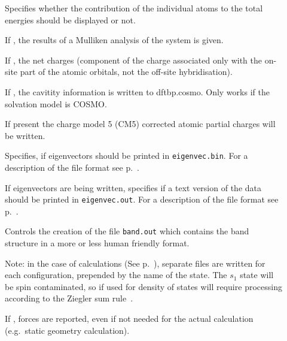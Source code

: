 \begin{description}

\item[] Specifies whether the contribution of the
  individual atoms to the total energies should be displayed or not.

\item[] If , the results of a Mulliken analysis of
  the system is given.

\item[] If , the net charges (component of the
  charge associated only with the on-site part of the atomic orbitals, not the
  off-site hybridisation).

\item[] If , the cavitity information is
  written to dftbp.cosmo. Only works if the solvation model is COSMO.

\item[] If present the charge model 5 (CM5)\cite{marenich2012} corrected
  atomic partial charges will be written.

\item[] Specifies, if eigenvectors should be printed in
  \verb|eigenvec.bin|. For a description of the file format see
  p.~.

\item[] If eigenvectors are being written, specifies if a
  text version of the data should be printed in \verb|eigenvec.out|. For a
  description of the file format see p.~.

\item[] Controls the creation of the file
  \verb|band.out| which contains the band structure in a more or less
  human friendly format.

  Note: in the case of  calculations (See
  p.~), separate files are written for each
  configuration, prepended by the name of the state. The $s_1$ state
  will be spin contaminated, so if used for density of states will
  require processing according to the Ziegler sum
  rule~\cite{baerends-TCA-43-261}.

\item[] If , forces are reported, even if not needed
  for the actual calculation (e.g.\ static geometry calculation).

\end{description}

